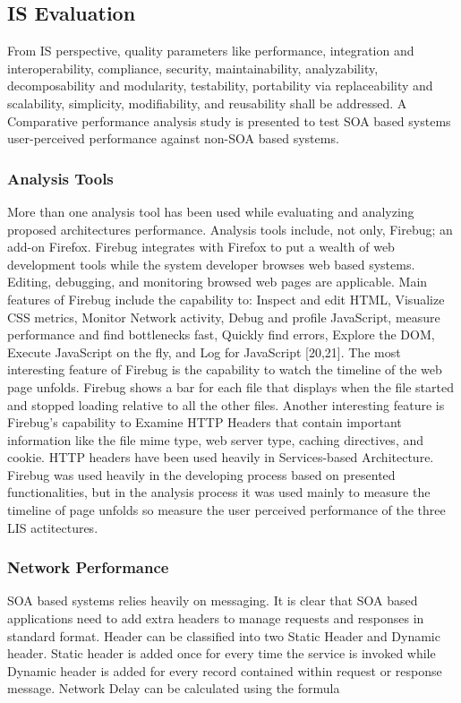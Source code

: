 \documentclass[12pt,a4paper,final,twoside,onecolumn,titlepage]{book}
\begin{document}
\subsection{IS Evaluation}
From \gls{IS} perspective, quality parameters like performance, integration and interoperability, compliance, security, maintainability, analyzability, decomposability and modularity, testability, portability via replaceability and scalability, simplicity, modifiability, and reusability shall be addressed. A Comparative performance analysis study is presented to test \gls{SOA} based systems user-perceived performance against non-\gls{SOA} based systems.

\subsubsection{Analysis Tools}
More than one analysis tool has been used while evaluating and analyzing proposed architectures performance. Analysis tools include, not only, Firebug; an add-on Firefox. Firebug integrates with Firefox to put a wealth of web development tools while the system developer browses web based systems. Editing, debugging, and monitoring browsed web pages are applicable. Main features of Firebug include the capability to: Inspect and edit HTML, Visualize CSS metrics, Monitor Network activity, Debug and profile JavaScript, measure performance and find bottlenecks fast, Quickly find errors, Explore the DOM, Execute JavaScript on the fly, and Log for JavaScript [20,21].
The most interesting feature of Firebug is the capability to watch the timeline of the web page unfolds. Firebug shows a bar for each file that displays when the file started and stopped loading relative to all the other files. Another interesting feature is Firebug’s capability to Examine \gls{HTTP} Headers that contain important information like the file mime type, web server type, caching directives, and cookie. \gls{HTTP} headers have been used heavily in Services-based Architecture.
Firebug was used heavily in the developing process based on presented functionalities, but in the analysis process it was used mainly to measure the timeline of page unfolds so measure the user perceived performance of the three LIS actitectures.

\subsubsection{Network Performance}
\gls{SOA} based systems relies heavily on messaging. It is clear that \gls{SOA} based applications need to add extra headers to manage requests and responses in standard format. Header can be classified into two Static Header and Dynamic header. Static header is added once for every time the service is invoked while Dynamic header is added for every record contained within request or response message. Network Delay can be calculated using the formula \cite{EV08}
\end{document}
